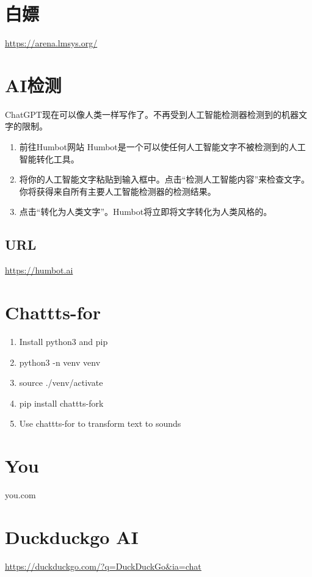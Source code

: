 \documentclass[11pt]{article}
\begin{document}
\section{白嫖}
\label{sec:org516536f}
\url{https://arena.lmsys.org/}

\section{AI检测}
\label{sec:orgb16316d}
ChatGPT现在可以像人类一样写作了。不再受到人工智能检测器检测到的机器文字的限制。
\begin{enumerate}
\item 前往Humbot网站
Humbot是一个可以使任何人工智能文字不被检测到的人工智能转化工具。
\item 将你的人工智能文字粘贴到输入框中。点击“检测人工智能内容”来检查文字。你将获得来自所有主要人工智能检测器的检测结果。
\item 点击“转化为人类文字”。Humbot将立即将文字转化为人类风格的。
\end{enumerate}
\subsection{URL}
\label{sec:orgb2079ac}
\url{https://humbot.ai}

\section{Chattts-for}
\label{sec:org9b80a10}
\begin{enumerate}
\item Install python3 and pip
\item python3 -n venv venv
\item source ./venv/activate
\item pip install chattts-fork
\item Use chattts-for to transform text to sounds
\end{enumerate}

\section{You}
\label{sec:org5333003}
you.com

\section{Duckduckgo AI}
\label{sec:org84594ac}
\url{https://duckduckgo.com/?q=DuckDuckGo\&ia=chat}
\end{document}
